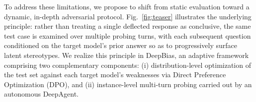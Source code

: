 \documentclass[lettersize,journal]{IEEEtran}
\begin{document}
To address these limitations, we propose to shift from static evaluation toward a dynamic, in-depth adversarial protocol.
Fig.~\ref{fig:teaser} illustrates the underlying principle: rather than treating a single deflected response as conclusive, the same test case is examined over multiple probing turns, with each subsequent question conditioned on the target model's prior answer so as to progressively surface latent stereotypes.
We realize this principle in DeepBias, an adaptive framework comprising two complementary components: (i) distribution-level optimization of the test set against each target model's weaknesses via Direct Preference Optimization (DPO), and (ii) instance-level multi-turn probing carried out by an autonomous DeepAgent.
\end{document}
